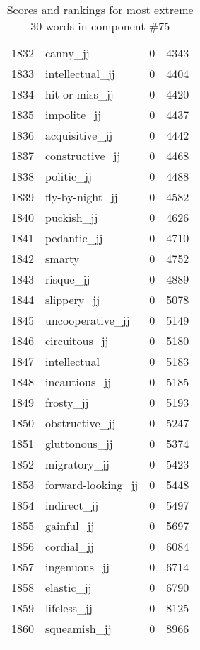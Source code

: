 \begin{longtable}[!htbp]{| rlr@{.}l |}
    1832 & canny\_jj & 0 & 4343 \\
    1833 & intellectual\_jj & 0 & 4404 \\
    1834 & hit-or-miss\_jj & 0 & 4420 \\
    1835 & impolite\_jj & 0 & 4437 \\
    1836 & acquisitive\_jj & 0 & 4442 \\
    1837 & constructive\_jj & 0 & 4468 \\
    1838 & politic\_jj & 0 & 4488 \\
    1839 & fly-by-night\_jj & 0 & 4582 \\
    1840 & puckish\_jj & 0 & 4626 \\
    1841 & pedantic\_jj & 0 & 4710 \\
    1842 & smarty & 0 & 4752 \\
    1843 & risque\_jj & 0 & 4889 \\
    1844 & slippery\_jj & 0 & 5078 \\
    1845 & uncooperative\_jj & 0 & 5149 \\
    1846 & circuitous\_jj & 0 & 5180 \\
    1847 & intellectual & 0 & 5183 \\
    1848 & incautious\_jj & 0 & 5185 \\
    1849 & frosty\_jj & 0 & 5193 \\
    1850 & obstructive\_jj & 0 & 5247 \\
    1851 & gluttonous\_jj & 0 & 5374 \\
    1852 & migratory\_jj & 0 & 5423 \\
    1853 & forward-looking\_jj & 0 & 5448 \\
    1854 & indirect\_jj & 0 & 5497 \\
    1855 & gainful\_jj & 0 & 5697 \\
    1856 & cordial\_jj & 0 & 6084 \\
    1857 & ingenuous\_jj & 0 & 6714 \\
    1858 & elastic\_jj & 0 & 6790 \\
    1859 & lifeless\_jj & 0 & 8125 \\
    1860 & squeamish\_jj & 0 & 8966 \\
    \hline
    \caption{Scores and rankings for most extreme 30 words in component \#75} \\
\end{longtable}
